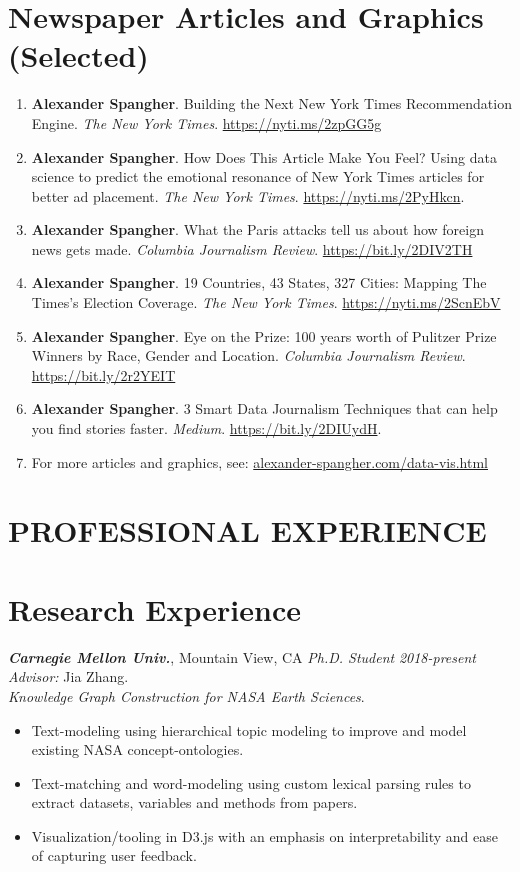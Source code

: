 \documentclass[margin]{res}
\newcommand{\fullhrulefill}{%
	\vspace{.7\baselineskip}
	\hspace*{-\sectionwidth}\hrulefill%
}
\begin{document}
\begin{resume}
\section{Newspaper Articles and Graphics (Selected)}
\begin{enumerate}
	\item \textbf{Alexander Spangher}. Building the Next New York Times Recommendation Engine. \textit{The New York Times}. \url{https://nyti.ms/2zpGG5g}
	\item \textbf{Alexander Spangher}. How Does This Article Make You Feel? Using data science to predict the emotional resonance of New York Times articles for better ad placement. \textit{The New York Times}. \url{https://nyti.ms/2PyHkcn}.
	\item \textbf{Alexander Spangher}. What the Paris attacks tell us about how foreign news gets made. \textit{Columbia Journalism Review}. \url{https://bit.ly/2DIV2TH}
	\item \textbf{Alexander Spangher}. 19 Countries, 43 States, 327 Cities: Mapping The Times’s Election Coverage. \textit{The New York Times}. \url{https://nyti.ms/2ScnEbV}
	\item \textbf{Alexander Spangher}. Eye on the Prize: 100 years worth of Pulitzer Prize Winners by Race, Gender and Location. \textit{Columbia Journalism Review}. \url{https://bit.ly/2r2YEIT}
	\item \textbf{Alexander Spangher}. 3 Smart Data Journalism Techniques that can help you find stories faster. \textit{Medium}. \url{https://bit.ly/2DIUydH}.	
	\item For more articles and graphics, see: \url{alexander-spangher.com/data-vis.html}
\end{enumerate}

\vspace{5\baselineskip}
\section{PROFESSIONAL EXPERIENCE}
\vspace{\baselineskip}
\fullhrulefill
\section{Research Experience}
{\sl \bf Carnegie Mellon Univ.}, Mountain View, CA {\sl Ph.D. Student} \hfill {\it 2018-present}\\
\textit{Advisor:} Jia Zhang.\\
\textit{Knowledge Graph Construction for NASA Earth Sciences}.
\begin{itemize}
	\item Text-modeling using hierarchical topic modeling to improve and model existing NASA concept-ontologies.
	\item Text-matching and word-modeling using custom lexical parsing rules to extract datasets, variables and methods from papers.
	\item Visualization/tooling in D3.js with an emphasis on interpretability and ease of capturing user feedback.
\end{itemize}



\end{resume}
\end{document}
